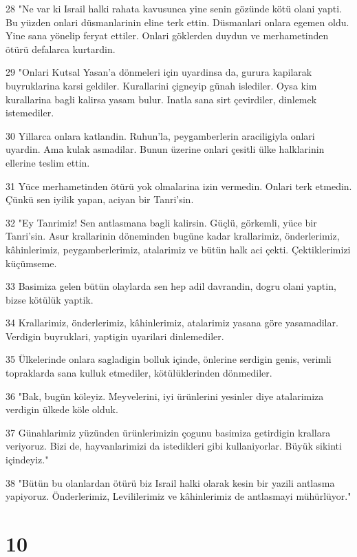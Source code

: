 \par 28 "Ne var ki Israil halki rahata kavusunca yine senin gözünde kötü olani yapti. Bu yüzden onlari düsmanlarinin eline terk ettin. Düsmanlari onlara egemen oldu. Yine sana yönelip feryat ettiler. Onlari göklerden duydun ve merhametinden ötürü defalarca kurtardin.
\par 29 "Onlari Kutsal Yasan'a dönmeleri için uyardinsa da, gurura kapilarak buyruklarina karsi geldiler. Kurallarini çigneyip günah islediler. Oysa kim kurallarina bagli kalirsa yasam bulur. Inatla sana sirt çevirdiler, dinlemek istemediler.
\par 30 Yillarca onlara katlandin. Ruhun'la, peygamberlerin araciligiyla onlari uyardin. Ama kulak asmadilar. Bunun üzerine onlari çesitli ülke halklarinin ellerine teslim ettin.
\par 31 Yüce merhametinden ötürü yok olmalarina izin vermedin. Onlari terk etmedin. Çünkü sen iyilik yapan, aciyan bir Tanri'sin.
\par 32 "Ey Tanrimiz! Sen antlasmana bagli kalirsin. Güçlü, görkemli, yüce bir Tanri'sin. Asur krallarinin döneminden bugüne kadar krallarimiz, önderlerimiz, kâhinlerimiz, peygamberlerimiz, atalarimiz ve bütün halk aci çekti. Çektiklerimizi küçümseme.
\par 33 Basimiza gelen bütün olaylarda sen hep adil davrandin, dogru olani yaptin, bizse kötülük yaptik.
\par 34 Krallarimiz, önderlerimiz, kâhinlerimiz, atalarimiz yasana göre yasamadilar. Verdigin buyruklari, yaptigin uyarilari dinlemediler.
\par 35 Ülkelerinde onlara sagladigin bolluk içinde, önlerine serdigin genis, verimli topraklarda sana kulluk etmediler, kötülüklerinden dönmediler.
\par 36 "Bak, bugün köleyiz. Meyvelerini, iyi ürünlerini yesinler diye atalarimiza verdigin ülkede köle olduk.
\par 37 Günahlarimiz yüzünden ürünlerimizin çogunu basimiza getirdigin krallara veriyoruz. Bizi de, hayvanlarimizi da istedikleri gibi kullaniyorlar. Büyük sikinti içindeyiz."
\par 38 "Bütün bu olanlardan ötürü biz Israil halki olarak kesin bir yazili antlasma yapiyoruz. Önderlerimiz, Levililerimiz ve kâhinlerimiz de antlasmayi mühürlüyor."

\chapter{10}

